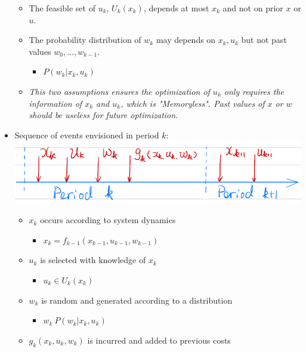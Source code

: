 \begin{itemize}
        \begin{itemize}
            \item The feasible set of $u_k$, $U_k(x_k)$, depends at most $x_k$ and not on prior $x$ or $u$.
            \item The probability distribution of $w_k$ may depends on $x_k,u_k$ but not past values $w_0,...,w_{k-1}$.
                \begin{itemize}
                    \item $P(w_k|x_k,u_k)$
                \end{itemize}
            \item [] \emph{This two assumptions ensures the optimization of $u_k$ only requires the information of $x_k$ and $u_k$, which is "Memoryless". 
            Past values of $x$ or $w$ should be useless for future optimization.}
        \end{itemize}
    \item Sequence of events envisioned in period $k$: \\
    \includegraphics[width=15cm]{Lecture1/Fig1.png}
        \newpage
        \begin{itemize}
            \item $x_k$ occurs according to system dynamics
                \begin{itemize}
                    \item $x_k=f_{k-1}(x_{k-1},u_{k-1},w_{k-1})$
                \end{itemize}
            \item $u_k$ is selected with knowledge of $x_k$
                \begin{itemize}
                    \item $u_k\in U_k(x_k)$
                \end{itemize}
            \item $w_k$ is random and generated according to a distribution
                \begin{itemize}
                    \item $w_k ~ P(w_k|x_k,u_k)$
                \end{itemize}
            \item $g_k(x_k,u_k,w_k)$ is incurred and added to previous costs

\end{itemize}
\end{itemize}
